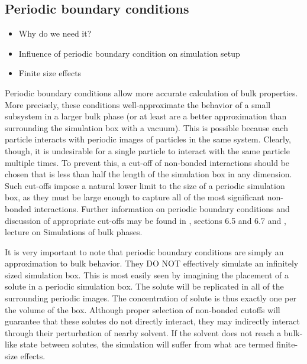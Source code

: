 \documentclass[9pt,bestpractices]{livecoms}
\begin{document}
\subsection{Periodic boundary conditions}
\label{sec:periodic}
\begin{itemize}
\item Why do we need it?
\item Influence of periodic boundary condition on simulation setup
\item Finite size effects
\end{itemize}


Periodic boundary conditions allow more accurate calculation of bulk properties. 
More precisely, these conditions well-approximate the behavior of a small subsystem in a larger bulk phase (or at least are a better approximation than surrounding the simulation box with a vacuum). 
This is possible because each particle interacts with periodic images of particles in the same system. 
Clearly, though, it is undesirable for a single particle to interact with the same particle multiple times. 
To prevent this, a cut-off of non-bonded interactions should be chosen that is less than half the length of the simulation box in any dimension. 
Such cut-offs impose a natural lower limit to the size of a periodic simulation box, as they must be large enough to capture all of the most significant non-bonded interactions. 
Further information on periodic boundary conditions and discussion of appropriate cut-offs may be found in \citet{LeachBook}, sections 6.5 and 6.7 and \citet{ShellNotes}, lecture on Simulations of bulk phases.

It is very important to note that periodic boundary conditions are simply an approximation to bulk behavior. 
They DO NOT effectively simulate an infinitely sized simulation box. 
This is most easily seen by imagining the placement of a solute in a periodic simulation box. 
The solute will be replicated in all of the surrounding periodic images. 
The concentration of solute is thus exactly one per the volume of the box. 
Although proper selection of non-bonded cutoffs will guarantee that these solutes do not directly interact, they may indirectly interact through their perturbation of nearby solvent. 
If the solvent does not reach a bulk-like state between solutes, the simulation will suffer from what are termed finite-size effects. 
\end{document}
